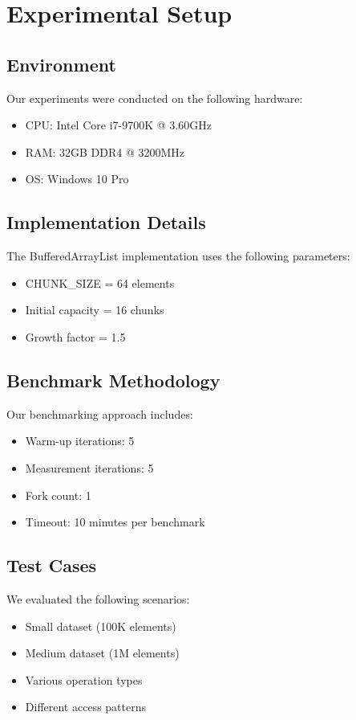 \section{Experimental Setup}
\subsection{Environment}
Our experiments were conducted on the following hardware:
\begin{itemize}
    \item CPU: Intel Core i7-9700K @ 3.60GHz
    \item RAM: 32GB DDR4 @ 3200MHz
    \item OS: Windows 10 Pro
\end{itemize}

\subsection{Implementation Details}
The BufferedArrayList implementation uses the following parameters:
\begin{itemize}
    \item CHUNK\_SIZE = 64 elements
    \item Initial capacity = 16 chunks
    \item Growth factor = 1.5
\end{itemize}

\subsection{Benchmark Methodology}
Our benchmarking approach includes:
\begin{itemize}
    \item Warm-up iterations: 5
    \item Measurement iterations: 5
    \item Fork count: 1
    \item Timeout: 10 minutes per benchmark
\end{itemize}

\subsection{Test Cases}
We evaluated the following scenarios:
\begin{itemize}
    \item Small dataset (100K elements)
    \item Medium dataset (1M elements)
    \item Various operation types
    \item Different access patterns
\end{itemize}

